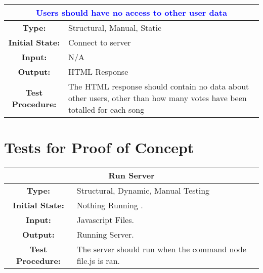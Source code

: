\documentclass[12pt, titlepage]{article}
\begin{document}
\begin{center}
\begin{table}[H]
\begin{tabularx}{\textwidth}{| c X |}
\hline
\multicolumn{2}{|c|}{\textbf{\textcolor{blue}{Users should have no access to other user data}}}\\
\hline
\textbf{Type: } & Structural, Manual, Static\\
\textbf{Initial State: } & Connect to server\\
\textbf{Input: } & N/A\\
\textbf{Output: } & HTML Response \\
\textbf{Test Procedure:  } & The HTML response should contain no data about other users, other than how many votes have been totalled for each song \\
\hline
\end{tabularx}
\end{table}
\end{center}

\section{Tests for Proof of Concept}


	
\begin{center}
\begin{table}[H]
\begin{tabularx}{\textwidth}{| c X |}
\hline
\multicolumn{2}{|c|}{\textbf{Run Server}}\\
\hline
\textbf{Type: } & Structural, Dynamic, Manual Testing\\

\textbf{Initial State: } & Nothing Running .\\

\textbf{Input: } & Javascript Files.\\

\textbf{Output: } & Running Server.\\

\textbf{Test Procedure: } & The server should run when the command node file.js is ran. \\
\hline
\end{tabularx}
\end{table}
\end{center}
	
\end{document}
